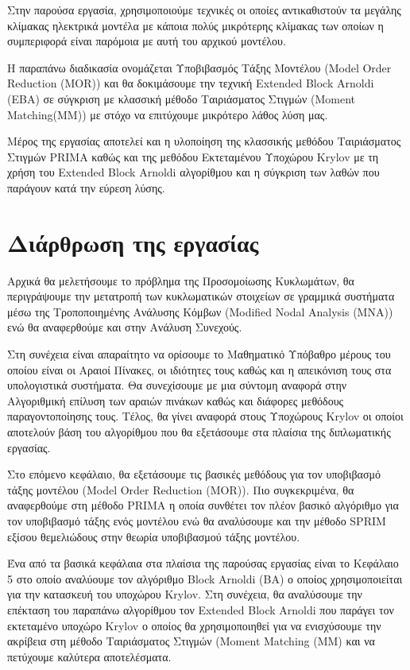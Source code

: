 Στην παρούσα εργασία, χρησιμοποιούμε τεχνικές οι οποίες αντικαθιστούν τα μεγάλης κλίμακας ηλεκτρικά μοντέλα με κάποια πολύς μικρότερης κλίμακας των οποίων η συμπεριφορά είναι παρόμοια με αυτή του αρχικού μοντέλου.

Η παραπάνω διαδικασία ονομάζεται Υποβιβασμός Τάξης Μοντέλου (\textlatin{Model Order Reduction (MOR)}) και θα δοκιμάσουμε την τεχνική \textlatin{Extended Block Arnoldi (ΕΒΑ)} σε σύγκριση με κλασσική μέθοδο Ταιριάσματος Στιγμών (\textlatin{Moment Matching(MM)}) με στόχο να επιτύχουμε μικρότερο λάθος λύση μας.

Μέρος της εργασίας αποτελεί και η υλοποίηση της κλασσικής μεθόδου Ταιριάσματος Στιγμών \textlatin{PRIMA} καθώς και της μεθόδου Εκτεταμένου Υποχώρου \textlatin{Krylov} με τη χρήση του \textlatin{Extended Block Arnoldi} αλγορίθμου και η σύγκριση των λαθών που παράγουν κατά την εύρεση λύσης.

\section{Διάρθρωση της εργασίας}


Αρχικά θα μελετήσουμε το πρόβλημα της Προσομοίωσης Κυκλωμάτων, θα περιγράψουμε την μετατροπή των κυκλωματικών στοιχείων σε γραμμικά συστήματα μέσω της Τροποποιημένης Ανάλυσης Κόμβων (\textlatin{Modified Nodal Analysis (MNA)}) ενώ θα αναφερθούμε και στην Ανάλυση Συνεχούς.

Στη συνέχεια είναι απαραίτητο να ορίσουμε το Μαθηματικό Υπόβαθρο μέρους του οποίου είναι οι Αραιοί Πίνακες, οι ιδιότητες τους καθώς και η απεικόνιση τους στα υπολογιστικά συστήματα. Θα συνεχίσουμε με μια σύντομη αναφορά στην Αλγοριθμική επίλυση των αραιών πινάκων καθώς και διάφορες μεθόδους παραγοντοποίησης τους. Τέλος, θα γίνει αναφορά στους Υποχώρους \textlatin{Krylov} οι οποίοι αποτελούν βάση του αλγορίθμου που θα εξετάσουμε στα πλαίσια της διπλωματικής εργασίας.

Στο επόμενο κεφάλαιο, θα εξετάσουμε τις βασικές μεθόδους για τον υποβιβασμό τάξης μοντέλου (\textlatin{Model Order Reduction (MOR)}). Πιο συγκεκριμένα, θα αναφερθούμε στη μέθοδο \textlatin{PRIMA} η οποία συνθέτει τον πλέον βασικό αλγόριθμο για τον υποβιβασμό τάξης ενός μοντέλου ενώ θα αναλύσουμε και την μέθοδο \textlatin{SPRIM} εξίσου θεμελιώδους στην θεωρία υποβιβασμού τάξης μοντέλου.

Ένα από τα βασικά κεφάλαια στα πλαίσια της παρούσας εργασίας είναι το Κεφάλαιο 5 στο οποίο αναλύουμε τον αλγόριθμο \textlatin{Block Arnoldi (BA)} ο οποίος χρησιμοποιείται για την κατασκευή του υποχώρου \textlatin{Krylov}. Στη συνέχεια, θα αναλύσουμε την επέκταση του παραπάνω αλγορίθμου τον \textlatin{Extended Block Arnoldi} που παράγει τον εκτεταμένο υποχώρο \textlatin{Krylov} ο οποίος θα χρησιμοποιηθεί για να ενισχύσουμε την ακρίβεια στη μέθοδο Ταιριάσματος Στιγμών (\textlatin{Moment Matching (MM)} και να πετύχουμε καλύτερα αποτελέσματα.


